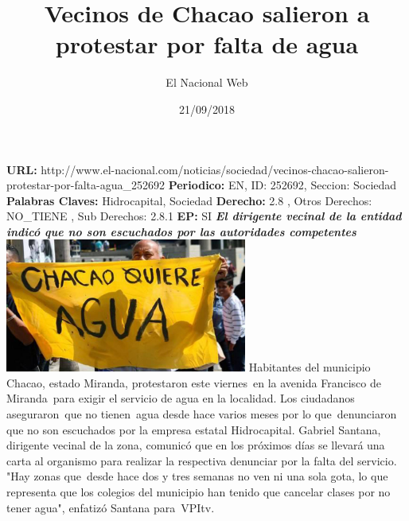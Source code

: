 \documentclass{article}%
\title{\textbf{Vecinos de Chacao salieron a protestar por falta de agua}}%
\author{El Nacional Web}%
\date{21/09/2018}%
\begin{document}
%
\normalsize%
\maketitle%
\textbf{URL: }%
http://www.el{-}nacional.com/noticias/sociedad/vecinos{-}chacao{-}salieron{-}protestar{-}por{-}falta{-}agua\_252692\newline%
%
\textbf{Periodico: }%
EN, %
ID: %
252692, %
Seccion: %
Sociedad\newline%
%
\textbf{Palabras Claves: }%
Hidrocapital, Sociedad\newline%
%
\textbf{Derecho: }%
2.8%
, Otros Derechos: %
NO\_TIENE%
, Sub Derechos: %
2.8.1%
\newline%
%
\textbf{EP: }%
SI\newline%
\newline%
%
\textbf{\textit{El dirigente vecinal de la entidad indicó que no son escuchados por las autoridades competentes}}%
\newline%
\newline%
%
\includegraphics[width=300px]{32.jpg}%
\newline%
%
Habitantes del municipio Chacao, estado Miranda, protestaron este viernes~en la avenida Francisco de Miranda~para exigir el servicio de agua en la localidad.%
\newline%
%
Los ciudadanos aseguraron~que no tienen~agua desde hace varios meses por lo que~denunciaron que no son escuchados por la empresa estatal Hidrocapital.%
\newline%
%
Gabriel Santana, dirigente vecinal de la zona, comunicó que en los próximos días se llevará una carta al organismo para realizar la respectiva denunciar por la falta del servicio.%
\newline%
%
"Hay zonas que~desde hace dos y tres semanas no ven ni una sola gota, lo que representa que los colegios del municipio han tenido que cancelar clases por no tener agua", enfatizó Santana para~VPItv.%
\newline%
%
\end{document}
